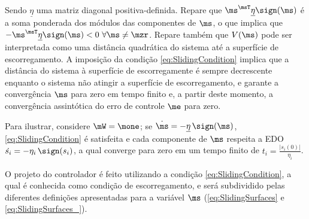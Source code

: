 \documentclass[]{politex}
\begin{document}
Sendo $\underline{\eta}$ uma matriz diagonal positiva-definida. Repare que $\ms^\msT \underline{\eta} \sign(\ms)$ \'e a soma ponderada dos m\'odulos das componentes de $\ms$, o que implica que $-  \ms^\msT \underline{\eta} \sign(\ms) < 0 \,\, \forall \ms \neq \mzr$. Repare tamb\'em que $V(\ms)$ pode ser interpretada como uma distância quadrática do sistema até a superfície de escorregamento. A imposição da condição \eqref{eq:SlidingCondition} implica que a distância do sistema à superfície de escorregamente é sempre decrescente enquanto o sistema não atingir a superfície de escorregamento, e garante a convergência $\ms$ para zero em tempo finito e, a partir deste momento, a convergência assintótica do erro de controle $\me$ para zero. 

Para ilustrar, considere $\mW = \mone$; se $\dot{\ms} = - \underline{\eta} \,\sign(\ms)$,  \eqref{eq:SlidingCondition} \'e satisfeita e cada componente de $\ms$ respeita a EDO $\dot{s_i} = - \eta_i \,\sign(s_i)$, a qual converge para zero em um tempo finito de $t_i = \frac{|s_i(0)|}{\eta_i}$.

O projeto do controlador \'e feito utilizando a condi\c{c}\~ao \eqref{eq:SlidingCondition}, a qual \'e conhecida como condi\c{c}\~ao de escorregamento, e será subdividido pelas diferentes definições apresentadas para a variável $\ms$ (\eqref{eq:SlidingSurfaces} e \eqref{eq:SlidingSurfaces_}).
\end{document}
